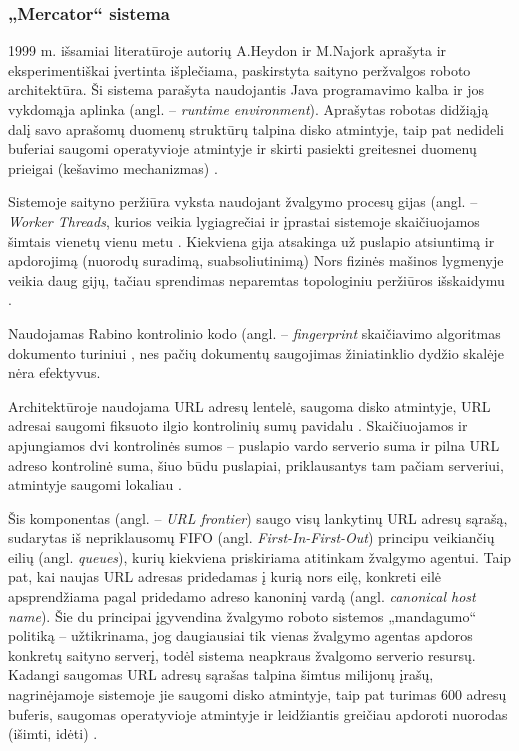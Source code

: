 \subsubsection{„Mercator“ sistema}

1999 m. išsamiai literatūroje autorių A.Heydon ir M.Najork aprašyta ir eksperimentiškai įvertinta išplečiama, paskirstyta saityno peržvalgos roboto architektūra. Ši sistema parašyta naudojantis Java programavimo kalba ir jos vykdomąja aplinka (angl. -- \textit{runtime environment}). Aprašytas robotas didžiąją dalį savo aprašomų duomenų struktūrų talpina disko atmintyje, taip pat nedideli buferiai saugomi operatyvioje atmintyje ir skirti pasiekti greitesnei duomenų prieigai (kešavimo mechanizmas) \cite{MercatorLiterature}.


Sistemoje saityno peržiūra vyksta naudojant žvalgymo procesų gijas (angl. -- \textit{Worker Threads}, kurios veikia lygiagrečiai ir įprastai sistemoje skaičiuojamos šimtais vienetų vienu metu \cite{MercatorLiterature}. Kiekviena gija atsakinga už puslapio atsiuntimą ir apdorojimą (nuorodų suradimą, suabsoliutinimą) Nors fizinės mašinos lygmenyje veikia daug gijų, tačiau sprendimas neparemtas topologiniu peržiūros išskaidymu \cite{MercatorLiterature}.

Naudojamas Rabino kontrolinio kodo (angl. -- \textit{fingerprint} skaičiavimo algoritmas dokumento turiniui \cite{RabinFingerprinting}, nes pačių dokumentų saugojimas žiniatinklio dydžio skalėje nėra efektyvus.


Architektūroje naudojama URL adresų lentelė, saugoma disko atmintyje, URL adresai saugomi fiksuoto ilgio kontrolinių sumų pavidalu \cite{Mercator}. Skaičiuojamos ir apjungiamos dvi kontrolinės sumos -- puslapio vardo serverio suma ir pilna URL adreso kontrolinė suma, šiuo būdu puslapiai, priklausantys tam pačiam serveriui, atmintyje saugomi lokaliau \cite{Mercator}.


Šis komponentas (angl. -- \textit{URL frontier}) saugo visų lankytinų URL adresų sąrašą, sudarytas iš nepriklausomų FIFO (angl. \textit{First-In-First-Out}) principu veikiančių eilių (angl. \textit{queues}), kurių kiekviena priskiriama atitinkam žvalgymo agentui. Taip pat, kai naujas URL adresas pridedamas į kurią nors eilę, konkreti eilė apsprendžiama pagal pridedamo adreso kanoninį vardą (angl. \textit{canonical host name}). Šie du principai įgyvendina žvalgymo roboto sistemos „mandagumo“ politiką -- užtikrinama, jog daugiausiai tik vienas žvalgymo agentas apdoros konkretų saityno serverį, todėl sistema neapkraus žvalgomo serverio resursų. Kadangi saugomas URL adresų sąrašas talpina šimtus milijonų įrašų, nagrinėjamoje sistemoje jie saugomi disko atmintyje, taip pat turimas 600 adresų buferis, saugomas operatyvioje atmintyje ir leidžiantis greičiau apdoroti nuorodas (išimti, idėti) \cite{MercatorLiterature}.


